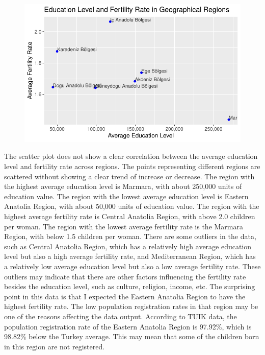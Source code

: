 \documentclass[
  11pt,
  a4paper,
  DIV=11,
  numbers=noendperiod]{scrartcl}
\begin{document}
\begin{figure}[H]

{\centering \includegraphics{analysis_files/figure-pdf/unnamed-chunk-9-1.pdf}

}

\end{figure}

The scatter plot does not show a clear correlation between the average
education level and fertility rate across regions. The points
representing different regions are scattered without showing a clear
trend of increase or decrease. The region with the highest average
education level is Marmara, with about 250,000 units of education value.
The region with the lowest average education level is Eastern Anatolia
Region, with about 50,000 units of education value. The region with the
highest average fertility rate is Central Anatolia Region, with above
2.0 children per woman. The region with the lowest average fertility
rate is the Marmara Region, with below 1.5 children per woman. There are
some outliers in the data, such as Central Anatolia Region, which has a
relatively high average education level but also a high average
fertility rate, and Mediterranean Region, which has a relatively low
average education level but also a low average fertility rate. These
outliers may indicate that there are other factors influencing the
fertility rate besides the education level, such as culture, religion,
income, etc. The surprising point in this data is that I expected the
Eastern Anatolia Region to have the highest fertility rate. The low
population registration rates in that region may be one of the reasons
affecting the data output. According to TUIK data, the population
registration rate of the Eastern Anatolia Region is 97.92\%, which is
98.82\% below the Turkey average. This may mean that some of the
children born in this region are not registered.
\end{document}
